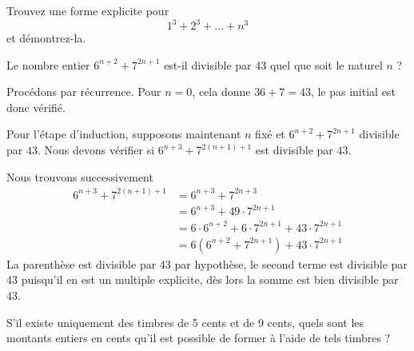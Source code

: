 \documentclass[12pt,french,oneside,a4paper]{memoir} %
\begin{document}
\begin{exo}
  Trouvez une forme explicite pour
  \begin{equation*}
    1^3 + 2^3 + \ldots + n^3
  \end{equation*}
  et démontrez-la.
\end{exo}

\begin{exo}
  Le nombre entier $6^{n+2}+7^{2n+1}$ est-il divisible par 43 quel que soit le naturel $n$ ?
  \begin{correction}
    Procédons par récurrence. Pour $n = 0$, cela donne $36+7 = 43$, le pas initial est donc vérifié.

    Pour l'étape d'induction, supposons maintenant $n$ fixé et $6^{n+2}+7^{2n+1}$ divisible par $43$. Nous devons vérifier si $6^{n+3} + 7^{2(n+1)+1}$ est divisible par $43$.
  
    Nous trouvons successivement
    \begin{align*}
      6^{n+3} + 7^{2(n+1)+1} &= 6^{n+3} + 7^{2n+3} \\
                             &= 6^{n+3} + 49 \cdot 7^{2n+1} \\
                             &= 6 \cdot 6^{n+2} + 6 \cdot 7^{2n+1} + 43 \cdot 7^{2n+1}\\
                             &= 6 (6^{n+2} + 7^{2n+1}) + 43 \cdot 7^{2n+1}
    \end{align*}
    La parenthèse est divisible par 43 par hypothèse, le second terme est divisible par 43 puisqu'il en est un multiple explicite, dès lors la somme est bien divisible par 43.
\end{correction}
\end{exo}

\begin{exo}
  S'il existe uniquement des timbres de 5 cents et de 9 cents, quels sont les montants entiers en cents qu'il est possible de former à l'aide de tels timbres ?
\end{exo}
\end{document}
